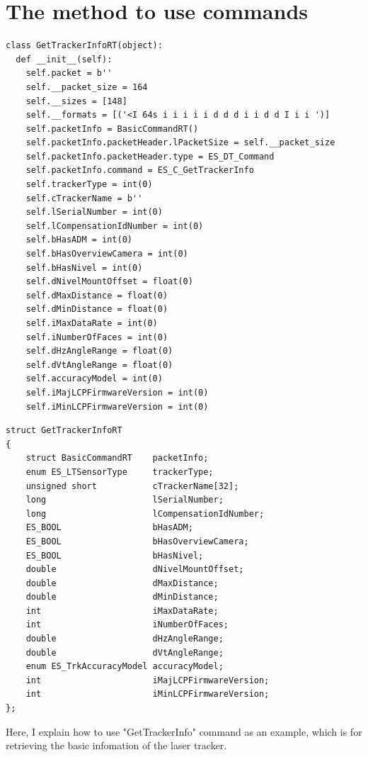 \documentclass[a4paper,12pt]{article}  %
\begin{document}
\section{The method to use commands}
\begin{lstlisting}[caption={The definition of the class for GetTrackerInfo}, label={lst:gettkrinfo} ]
class GetTrackerInfoRT(object):
  def __init__(self):
    self.packet = b''
    self.__packet_size = 164
    self.__sizes = [148]
    self.__formats = [('<I 64s i i i i i d d d i i d d I i i ')]
    self.packetInfo = BasicCommandRT()
    self.packetInfo.packetHeader.lPacketSize = self.__packet_size
    self.packetInfo.packetHeader.type = ES_DT_Command
    self.packetInfo.command = ES_C_GetTrackerInfo
    self.trackerType = int(0)  
    self.cTrackerName = b''  
    self.lSerialNumber = int(0)
    self.lCompensationIdNumber = int(0)
    self.bHasADM = int(0)
    self.bHasOverviewCamera = int(0)
    self.bHasNivel = int(0)
    self.dNivelMountOffset = float(0)
    self.dMaxDistance = float(0)
    self.dMinDistance = float(0)
    self.iMaxDataRate = int(0)
    self.iNumberOfFaces = int(0)
    self.dHzAngleRange = float(0)
    self.dVtAngleRange = float(0)
    self.accuracyModel = int(0)  
    self.iMajLCPFirmwareVersion = int(0)
    self.iMinLCPFirmwareVersion = int(0)
\end{lstlisting}
\begin{lstlisting}[caption={The structure of the binary for GetTrackerInfo defined in the header file}, label={lst:gettkrinfo_header} ]
struct GetTrackerInfoRT
{
    struct BasicCommandRT    packetInfo;
    enum ES_LTSensorType     trackerType;
    unsigned short           cTrackerName[32];         
    long                     lSerialNumber;
    long                     lCompensationIdNumber;      
    ES_BOOL                  bHasADM;
    ES_BOOL                  bHasOverviewCamera;
    ES_BOOL                  bHasNivel;
    double                   dNivelMountOffset;
    double                   dMaxDistance;               
    double                   dMinDistance;               
    int                      iMaxDataRate;              
    int                      iNumberOfFaces;
    double                   dHzAngleRange;              
    double                   dVtAngleRange;
    enum ES_TrkAccuracyModel accuracyModel;
    int                      iMajLCPFirmwareVersion;
    int                      iMinLCPFirmwareVersion;
};
\end{lstlisting}
Here, I explain how to use "GetTrackerInfo" command as an example, which is for retrieving the basic infomation of the laser tracker. 
\end{document}
